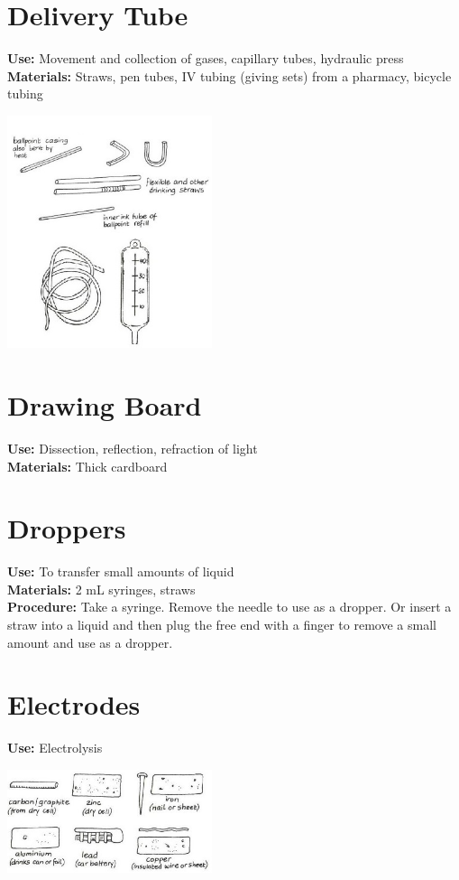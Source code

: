 \begin{multicols}{2}
\columnbreak

\section{Delivery Tube}
\label{sec:delivery-tube}
\vspace{-10pt}
\textbf{Use:} Movement and collection of gases, capillary tubes, hydraulic press\\
\textbf{Materials:} Straws, pen tubes, IV tubing (giving sets) from a pharmacy, bicycle tubing
\begin{center}
\includegraphics[width=0.45\textwidth]{./img/vso/tubes.jpg}
\end{center}

\section{Drawing Board}
\label{sec:drawing-board}
\vspace{-10pt}
\textbf{Use:} Dissection, reflection, refraction of light\\
\textbf{Materials:} Thick cardboard

\section{Droppers}
\label{sec:droppers}
\vspace{-10pt}
\textbf{Use:} To transfer small amounts of liquid \\
\textbf{Materials:} 2 mL syringes, straws\\
\textbf{Procedure:} Take a syringe. Remove the needle to use as a dropper. Or insert a straw into a liquid and then plug the free end with a finger to remove a small amount and use as a dropper.

\section{Electrodes}
\label{sec:electrodes}
\vspace{-10pt}
\textbf{Use:} Electrolysis
\begin{center}
\includegraphics[width=0.45\textwidth]{./img/vso/electrodes.jpg}
\end{center}


\end{multicols}
